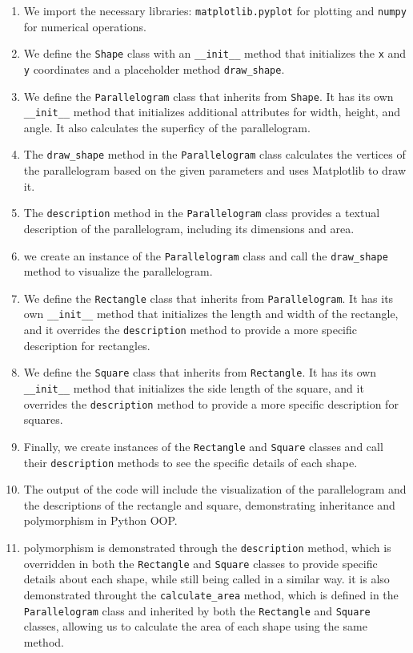 \documentclass[11pt]{article}
\begin{document}
\begin{enumerate}
\def\labelenumi{\arabic{enumi}.}
\item
  We import the necessary libraries: \texttt{matplotlib.pyplot} for
  plotting and \texttt{numpy} for numerical operations.
\item
  We define the \texttt{Shape} class with an \texttt{\_\_init\_\_}
  method that initializes the \texttt{x} and \texttt{y} coordinates and
  a placeholder method \texttt{draw\_shape}.
\item
  We define the \texttt{Parallelogram} class that inherits from
  \texttt{Shape}. It has its own \texttt{\_\_init\_\_} method that
  initializes additional attributes for width, height, and angle. It
  also calculates the superficy of the parallelogram.
\item
  The \texttt{draw\_shape} method in the \texttt{Parallelogram} class
  calculates the vertices of the parallelogram based on the given
  parameters and uses Matplotlib to draw it.
\item
  The \texttt{description} method in the \texttt{Parallelogram} class
  provides a textual description of the parallelogram, including its
  dimensions and area.
\item
  we create an instance of the \texttt{Parallelogram} class and call the
  \texttt{draw\_shape} method to visualize the parallelogram.
\item
  We define the \texttt{Rectangle} class that inherits from
  \texttt{Parallelogram}. It has its own \texttt{\_\_init\_\_} method
  that initializes the length and width of the rectangle, and it
  overrides the \texttt{description} method to provide a more specific
  description for rectangles.
\item
  We define the \texttt{Square} class that inherits from
  \texttt{Rectangle}. It has its own \texttt{\_\_init\_\_} method that
  initializes the side length of the square, and it overrides the
  \texttt{description} method to provide a more specific description for
  squares.
\item
  Finally, we create instances of the \texttt{Rectangle} and
  \texttt{Square} classes and call their \texttt{description} methods to
  see the specific details of each shape.
\item
  The output of the code will include the visualization of the
  parallelogram and the descriptions of the rectangle and square,
  demonstrating inheritance and polymorphism in Python OOP.
\item
  polymorphism is demonstrated through the \texttt{description} method,
  which is overridden in both the \texttt{Rectangle} and \texttt{Square}
  classes to provide specific details about each shape, while still
  being called in a similar way. it is also demonstrated throught the
  \texttt{calculate\_area} method, which is defined in the
  \texttt{Parallelogram} class and inherited by both the
  \texttt{Rectangle} and \texttt{Square} classes, allowing us to
  calculate the area of each shape using the same method.
\end{enumerate}


    
    
    
\end{document}
